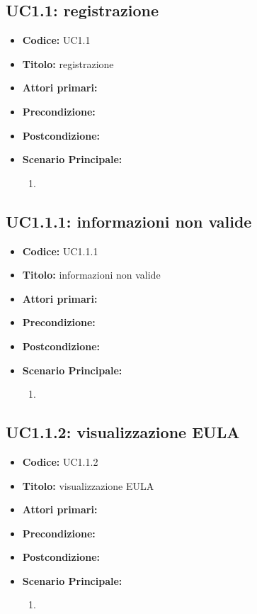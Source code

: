 ﻿\documentclass[../analisi-dei-requisiti]{subfiles}
\begin{document}
\subsection{UC1.1: registrazione}
\label{sub:uc1.1utente}
\begin{itemize}
  \item \textbf{Codice:} UC1.1
  \item \textbf{Titolo:} registrazione
  \item \textbf{Attori primari:}
  \item \textbf{Precondizione:}
  \item \textbf{Postcondizione:}
  \item \textbf{Scenario Principale:}
  \begin{enumerate}
    \item
  \end{enumerate} 
\end{itemize}

\subsection{UC1.1.1: informazioni non valide}
\label{sub:uc1.1.1utente}
\begin{itemize}
  \item \textbf{Codice:} UC1.1.1
  \item \textbf{Titolo:} informazioni non valide
  \item \textbf{Attori primari:}
  \item \textbf{Precondizione:}
  \item \textbf{Postcondizione:}
  \item \textbf{Scenario Principale:}
  \begin{enumerate}
    \item
  \end{enumerate}
\end{itemize}

\subsection{UC1.1.2: visualizzazione EULA}
\label{sub:uc1.1.2utente}
\begin{itemize}
  \item \textbf{Codice:} UC1.1.2
  \item \textbf{Titolo:} visualizzazione EULA
  \item \textbf{Attori primari:}
  \item \textbf{Precondizione:}
  \item \textbf{Postcondizione:}
  \item \textbf{Scenario Principale:}
  \begin{enumerate}
    \item
  \end{enumerate}
\end{itemize}
\end{document}
